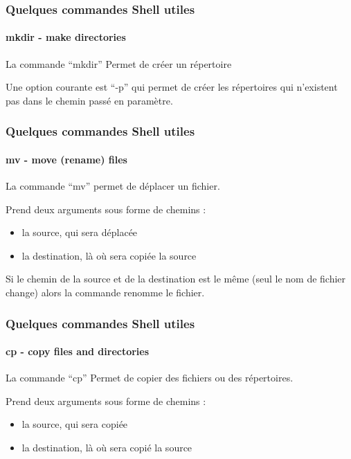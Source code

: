 \documentclass{beamer}
\begin{document}
            \begin{frame}
                \frametitle{Quelques commandes Shell utiles}
                \framesubtitle{mkdir - make directories}
                La commande \foreignquote{french}{mkdir} Permet de créer un répertoire
                
                Une option courante est \foreignquote{french}{-p} qui permet de créer les répertoires qui n'existent pas dans le chemin passé en paramètre.
            \end{frame}
            
            \begin{frame}
                \frametitle{Quelques commandes Shell utiles}
                \framesubtitle{mv - move (rename) files}
                La commande \foreignquote{french}{mv} permet de déplacer un fichier.
                
                Prend deux arguments sous forme de chemins :
                    \begin{itemize}
                        \item la source, qui sera déplacée
                        \item la destination, là où sera copiée la source
                    \end{itemize}
                    
                Si le chemin de la source et de la destination est le même (seul le nom de fichier change) alors la commande renomme le fichier.
            \end{frame}
            
            \begin{frame}
                \frametitle{Quelques commandes Shell utiles}
                \framesubtitle{cp - copy files and directories}
                La commande \foreignquote{french}{cp} Permet de copier des fichiers ou des répertoires.
                
                Prend deux arguments sous forme de chemins :
                    \begin{itemize}
                        \item la source, qui sera copiée
                        \item la destination, là où sera copié la source
                    \end{itemize}
            \end{frame}
            
\end{document}
